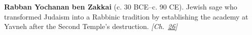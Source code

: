 \textbf{Rabban Yochanan ben Zakkai} (c. 30 BCE–c. 90 CE). Jewish sage who transformed Judaism into a Rabbinic tradition by establishing the academy at Yavneh after the Second Temple's destruction. \emph{[Ch.~\hyperref[ch:jewishcalendar]{26}]}

